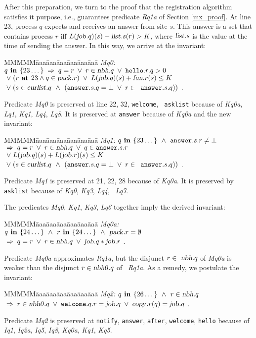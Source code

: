 \documentclass[10pt]{article} \usepackage[english]{babel}
\newenvironment{tab}{\begin{tabbing}
MMMMM\=aaa\=aaa\=aaa\=aaa\=aaa\=aaa\= \kill}{\end{tabbing}}
\def\S #1/{\mbox {\textsl{#1}}}
\def\B #1/{\mbox {\textbf{#1}}}
\def\T #1/{\mbox {\texttt{#1}}}
\def\Implies{\;\Rightarrow\;}
\def\Land   {\mbox{ $\;\land\;$ }}
\def\Lor    {\;\lor\;}
\begin{document}
After this preparation, we turn to the proof that the registration
algorithm satisfies it purpose, i.e., guarantees predicate \S Rq1a/ of
Section \ref{mx_proof}.  At line 23, process $q$ expects and receives
an answer from site $s$.  This answer is a set that contains process
$r$ iff $L(\S job/.q)(s) + \S list/.s(r) > K$, where $\S list/.s$ is
the value at the time of sending the answer.  In this way, we arrive
at the invariant:
\begin{tab}
  \S Mq0:/ \> $ q\B\ in /\{23\dots\} \Implies q = r \Lor
  r \in\S nbh/.q \Lor \T hello/.r.q > 0 $\\
  \> $ \Lor (r\B\ at /23 \land q\in\S pack/.r) \Lor
  L(\S job/.q)(s) + \S fun/.r(s) \leq K$ \\
  \> $ \Lor (s\in\S curlist/.q\Land(\T answer/.s.q = \bot \Lor r\in\T
  answer/.s.q)) $ .
\end{tab}
Predicate \S Mq0/ is preserved at line 22, 32, \T welcome/, \T
asklist/ because of \S Kq0a/, \S Lq1/, \S Kq1/, \S Lq4/, \S Lq8/.  It
is preserved at \T answer/ because of \S Kq0a/ and the new invariant:
\begin{tab}
  \S Mq1:/ \> $ q\B\ in /\{23\dots \} \Land \T answer/.s.r\ne\bot $ \\
  \> $ \Implies q = r \Lor r \in\S nbh/.q \Lor q\in\T answer/.s.r $\\
  \> $ \Lor L(\S job/.q)(s) + L(\S job/.r)(s) \leq K$ \\
  \> $ \Lor (s\in\S curlist/.q\Land(\T answer/.s.q = \bot \Lor r\in\T
  answer/.s.q)) $ .
\end{tab}
Predicate \S Mq1/ is preserved at 21, 22, 28 because of \S Kq0a/.  It
is preserved by \T asklist/ because of \S Kq0/, \S Kq3/, \S Lq4/, \S
Lq7/.

The predicates \S Mq0/, \S Kq1/, \S Kq3/, \S Lq6/ together imply the
derived invariant:
\begin{tab}
  \S Mq0a:/ \> $ q\B\ in /\{24\dots\} \Land r\B\ in /\{24\dots\}
  \Land \S pack/.r = \emptyset $ \\
  \> $ \Implies q = r\Lor r \in\S nbh/.q \Lor \S job/.q * \S job/.r$ .
\end{tab}
Predicate \S Mq0a/ approximates \S Rq1a/, but the disjunct $r\in\S
nbh/.q$ of \S Mq0a/ is weaker than the disjunct $r\in\S nbh0/.q$ of \S
Rq1a/.  As a remedy, we postulate the invariant:
\begin{tab}
  \S Mq2:/ \> $ q\B\ in /\{26\dots\} \Land r\in \S nbh/.q $\\
  \> $ \Implies r\in \S nbh0/.q \Lor \T welcome/.q.r = \S job/.q
  \Lor \S copy/.r(q) = \S job/.q $ .
\end{tab}
Predicate \S Mq2/ is preserved at \T notify/, \T answer/, \T after/,
\T welcome/, \T hello/ because of \S Iq1/, \S Iq2a/, \S Iq5/, \S Iq8/,
\S Kq0a/, \S Kq1/, \S Kq5/.
\end{document}
